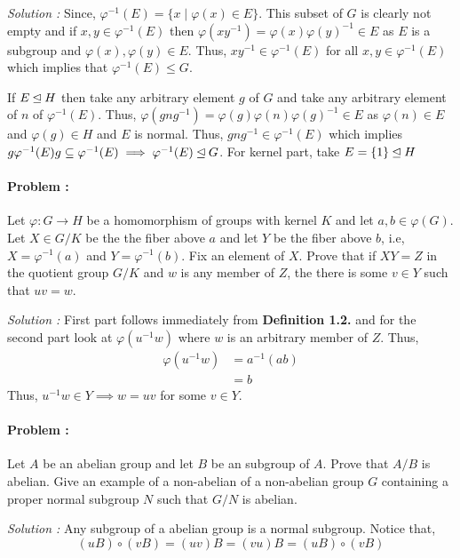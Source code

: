 \vspace{4mm}
\textit{Solution :} Since, $\varphi^{-1}(E) = \{x \mid \varphi(x) \in E\}$. This subset of $G$ is clearly not empty and
if $x,y \in \varphi^{-1}(E)$ then $\varphi(xy^{-1})=\varphi(x) \varphi(y)^{-1} \in E$ as $E$ is a subgroup and 
$\varphi(x), \varphi(y) \in E$. Thus, $xy^{-1} \in \varphi^{-1}(E)$ for all $x,y \in \varphi^{-1}(E)$ which implies that 
$\varphi^{-1}(E) \le G$.

If $E \unlhd H$ then take any arbitrary element $g$ of $G$ and take any arbitrary element of $n$ of $\varphi^{-1}(E)$.
Thus, $\varphi(gng^{-1}) = \varphi(g)\varphi(n) \varphi(g)^{-1} \in E$ as $\varphi(n) \in E$ and $\varphi(g) \in H$ and $E$ is normal.
Thus, $gng^{-1} \in \varphi^{-1}(E)$ which implies $g\varphi^{-1}(E)g \subseteq \varphi^{-1}(E) \implies \varphi^{-1}(E) \unlhd G$.
For kernel part, take $E = \{1\} \unlhd H$

\paragraph{Problem :} Let $\varphi : G \to H$ be a homomorphism of groups with kernel $K$ and let $a,b \in \varphi(G)$. Let $X \in G/K$ be
the the fiber above $a$ and let $Y$ be the fiber above $b$, i.e, $X = \varphi^{-1}(a)$ and $Y = \varphi^{-1}(b)$. Fix an element of $X$.
Prove that if $XY=Z$ in the quotient group $G/K$ and $w$ is any member of $Z$, the there is some $v \in Y$ such that $uv=w$.

\vspace{4mm}
\textit{Solution :} First part follows immediately from \textbf{Definition 1.2.} and for the second part look at $\varphi(u^{-1}w)$ where 
$w$ is an arbitrary member of $Z$. Thus,
\begin{align*}
    \varphi(u^{-1}w) &= a^{-1} (ab) \\
    &= b 
\end{align*}
Thus, $u^{-1}w \in Y \implies w = uv$ for some $v \in Y$.

\paragraph{Problem :} Let $A$ be an abelian group and let $B$ be an subgroup of $A$. Prove that $A/B$ is abelian.
Give an example of a non-abelian of a non-abelian group $G$ containing a proper normal subgroup $N$ such that $G/N$ is abelian. 

\vspace{4mm}
\textit{Solution :} Any subgroup of a abelian group is a normal subgroup. Notice that, 
\[ (uB) \circ (vB) = (uv)B = (vu)B = (uB) \circ (vB) \]

